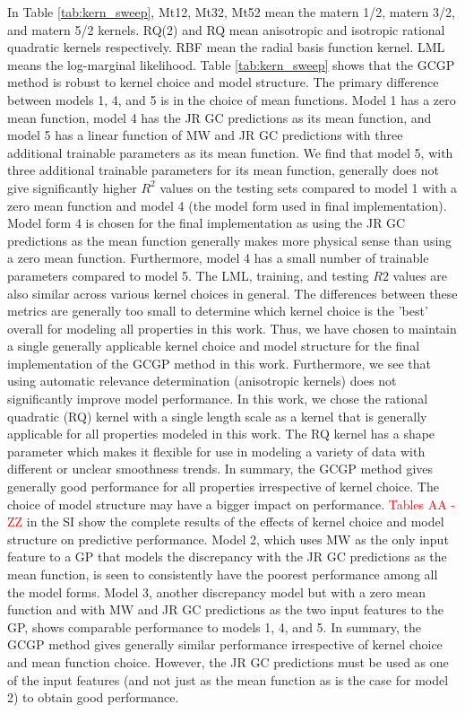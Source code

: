 \documentclass[journal=jacsat,manuscript=article]{achemso}
\begin{document}
In Table \ref{tab:kern_sweep}, Mt12, Mt32, Mt52 mean the matern 1/2, matern 3/2, and matern 5/2 kernels. RQ(2) and RQ mean anisotropic and isotropic rational quadratic kernels respectively. RBF mean the radial basis function kernel. LML means the log-marginal likelihood.
Table \ref{tab:kern_sweep} shows that the GCGP method is robust to kernel choice and model structure. The primary difference between models 1, 4, and 5 is in the choice of mean functions. Model 1 has a zero mean function, model 4 has the JR GC predictions as its mean function, and model 5 has a linear function of MW and JR GC predictions with three additional trainable parameters as its mean function.
We find that model 5, with three additional trainable parameters for its mean function, generally does not give significantly higher $R^2$ values on the testing sets compared to model 1 with a zero mean function and model 4 (the model form used in final implementation). Model form 4 is chosen for the final implementation as using the JR GC predictions as the mean function generally makes more physical sense than using a zero mean function. Furthermore, model 4 has a small number of trainable parameters compared to model 5.
The LML, training, and testing $ R2$ values are also similar across various kernel choices in general. The differences between these metrics are generally too small to determine which kernel choice is the 'best' overall for modeling all properties in this work. Thus, we have chosen to maintain a single generally applicable kernel choice and model structure for the final implementation of the GCGP method in this work.
Furthermore, we see that using automatic relevance determination (anisotropic kernels) does not significantly improve model performance.
In this work, we chose the rational quadratic (RQ) kernel with a single length scale as a kernel that is generally applicable for all properties modeled in this work. The RQ kernel has a shape parameter which makes it flexible for use in modeling a variety of data with different or unclear smoothness trends. In summary, the GCGP method gives generally good performance for all properties irrespective of kernel choice. The choice of model structure may have a bigger impact on performance.  \textcolor{red}{Tables AA - ZZ} in the SI show the complete results of the effects of kernel choice and model structure on predictive performance. Model 2, which uses MW as the only input feature to a  GP that models the discrepancy with the JR GC predictions as the mean function, is seen to consistently have the poorest performance among all the model forms. Model 3, another discrepancy model but with a zero mean function and with MW and JR GC predictions as the two input features to the GP, shows comparable performance to models 1, 4, and 5. In summary, the GCGP method gives generally similar performance irrespective of kernel choice and mean function choice. However, the JR GC predictions must be used as one of the input features (and not just as the mean function as is the case for model 2) to obtain good performance.
\end{document}
